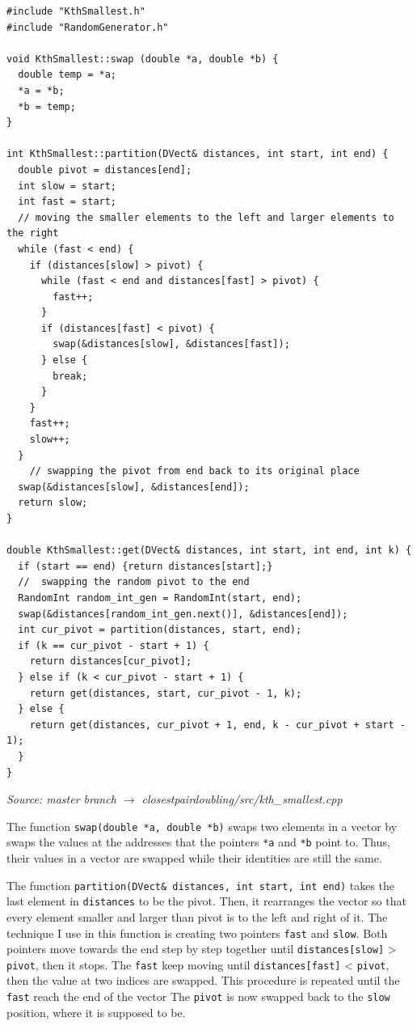 \documentclass[12pt,english,]{article}
\newcommand{\code}[1]{\colorbox{light-gray}{\texttt{#1}}}
\begin{document}
\begin{lstlisting}
#include "KthSmallest.h"
#include "RandomGenerator.h"

void KthSmallest::swap (double *a, double *b) {
  double temp = *a;
  *a = *b;
  *b = temp;
}

int KthSmallest::partition(DVect& distances, int start, int end) {
  double pivot = distances[end];
  int slow = start;
  int fast = start;
  // moving the smaller elements to the left and larger elements to the right
  while (fast < end) {
    if (distances[slow] > pivot) {
      while (fast < end and distances[fast] > pivot) {
        fast++;
      }
      if (distances[fast] < pivot) {
        swap(&distances[slow], &distances[fast]);
      } else {
        break;
      }
    }
    fast++;
    slow++;
  }
    // swapping the pivot from end back to its original place
  swap(&distances[slow], &distances[end]);
  return slow;
}

double KthSmallest::get(DVect& distances, int start, int end, int k) {
  if (start == end) {return distances[start];}
  //  swapping the random pivot to the end
  RandomInt random_int_gen = RandomInt(start, end);
  swap(&distances[random_int_gen.next()], &distances[end]);
  int cur_pivot = partition(distances, start, end);
  if (k == cur_pivot - start + 1) {
    return distances[cur_pivot];
  } else if (k < cur_pivot - start + 1) {
    return get(distances, start, cur_pivot - 1, k);
  } else {
    return get(distances, cur_pivot + 1, end, k - cur_pivot + start - 1);
  }
}

\end{lstlisting}
\vspace{-9truemm}
\begin{minipage}{1\textwidth}
  \begin{flushright}
  {\footnotesize \emph{Source: master branch $\rightarrow$ closestpairdoubling/src/kth\_smallest.cpp}\par}
  \end{flushright}
\end{minipage}
\vspace{0.5truemm}

The function \code{swap(double *a, double *b)} swaps two elements in a
vector by swaps the values at the addresses that the pointers \code{*a}
and \code{*b} point to. Thus, their values in a vector are swapped while
their identities are still the same.

The function \code{partition(DVect\& distances, int start, int end)}
takes the last element in \code{distances} to be the pivot. Then, it
rearranges the vector so that every element smaller and larger than
pivot is to the left and right of it. The technique I use in this
function is creating two pointers \code{fast} and \code{slow}. Both
pointers move towards the end step by step together until
\code{distances[slow]} \textgreater{} \code{pivot}, then it stops. The
\code{fast} keep moving until \code{distances[fast]} \textless{}
\code{pivot}, then the value at two indices are swapped. This procedure
is repeated until the \code{fast} reach the end of the vector The
\code{pivot} is now swapped back to the \code{slow} position, where it
is supposed to be.
\end{document}
